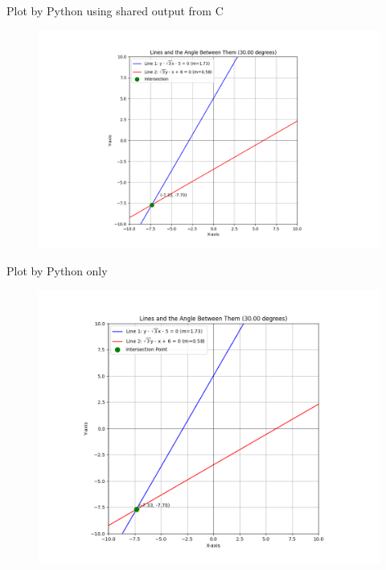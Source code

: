 \documentclass{beamer}
\begin{document}
\begin{frame}{Plot by Python using shared output from C}
\begin{figure}[H]
        \centering
        \includegraphics[width=1.0\columnwidth]{../figs/fig1.png}
        \caption{}
        \label{fig:1}
    \end{figure}
\end{frame}

 \begin{frame}{Plot by Python only}
\begin{figure}[H]
        \centering
        \includegraphics[width=0.7\columnwidth]{../figs/fig2.png}
        \caption{}
        \label{fig:2}
    \end{figure}
\end{frame}
\end{document}
